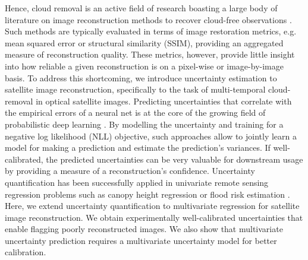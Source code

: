 \documentclass[10pt,twocolumn,letterpaper]{article}
\begin{document}
Hence,  cloud removal is an active field of research boasting a large body of literature on image reconstruction methods to recover cloud-free observations \cite{Enomoto_Sakurada_Wang_Fukui_Matsuoka_Nakamura_Kawaguchi_2017, Bermudez_Happ_Oliveira_Feitosa_2018, grohnfeldt2018conditional, meraner2020cloud, ebel2020multisensor, gao2020cloud, Sarukkai_Jain_Uzkent_Ermon_2019,  sebastianelli2022plfm}. Such methods are typically evaluated in terms of image restoration metrics, e.g. mean squared error or structural similarity (SSIM), providing an aggregated measure of reconstruction quality. These metrics, however, provide little insight into how reliable a given reconstruction is on a pixel-wise or image-by-image basis. To address this shortcoming, we introduce uncertainty estimation to satellite image reconstruction, specifically to the task of multi-temporal cloud-removal in optical satellite images.
 Predicting uncertainties that correlate with the empirical errors of a neural net is at the core of the growing field of probabilistic deep learning \cite{kendall2017uncertainties, takahashi2018student, skafte2019reliable}. 
 By modelling the uncertainty and training for a negative log likelihood (NLL) objective, such approaches allow to jointly learn a model for making a prediction and estimate the prediction's variances. 
 If well-calibrated, the predicted uncertainties can be very valuable for downstream usage by providing a measure of a reconstruction's confidence. 
Uncertainty quantification has been successfully applied in univariate remote sensing regression problems such as canopy height regression \cite{lang2022global} or flood risk estimation \cite{chaudhary2022flood}. 
Here, we extend uncertainty quantification to multivariate regression for satellite image reconstruction. We obtain experimentally well-calibrated uncertainties that enable flagging poorly reconstructed images. We also show that multivariate uncertainty prediction requires a multivariate uncertainty model for better calibration.
\end{document}

